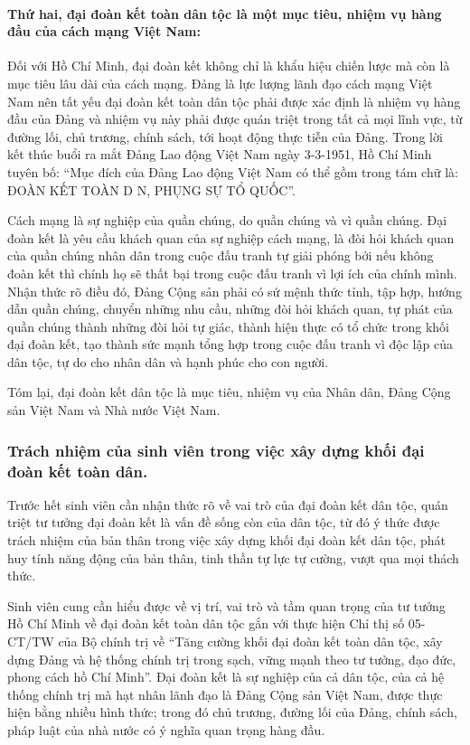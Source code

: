 \paragraph{Thứ hai, đại đoàn kết toàn dân tộc là một mục tiêu, nhiệm vụ hàng đầu của cách mạng Việt Nam:}
Đối với Hồ Chí Minh, đại đoàn kết không chỉ là khẩu hiệu chiến lược mà còn là mục tiêu lâu dài của cách mạng. Đảng là lực lượng lãnh đạo cách mạng Việt Nam nên tất yếu đại đoàn kết toàn dân tộc phải được xác định là nhiệm vụ hàng đầu của Đảng và nhiệm vụ này phải được quán triệt trong tất cả mọi lĩnh vực, từ đường lối, chủ trương, chính sách, tới hoạt động thực tiễn của Đảng. Trong lời kết thúc buổi ra mắt Đảng Lao động Việt Nam ngày 3-3-1951, Hồ Chí Minh tuyên bố: “Mục đích của Đảng Lao động Việt Nam có thể gồm trong tám chữ là: ĐOÀN KẾT TOÀN D N, PHỤNG SỰ TỔ QUỐC”.

Cách mạng là sự nghiệp của quần chúng, do quần chúng và vì quần chúng. Đại đoàn kết là yêu cầu khách quan của sự nghiệp cách mạng, là đòi hỏi khách quan của quần chúng nhân dân trong cuộc đấu tranh tự giải phóng bởi nếu không đoàn kết thì chính họ sẽ thất bại trong cuộc đấu tranh vì lợi ích của chính mình. Nhận thức rõ điều đó, Đảng Cộng sản phải có sứ mệnh thức tỉnh, tập hợp, hướng dẫn quần chúng, chuyển những nhu cầu, những đòi hỏi khách quan, tự phát của quần chúng thành những đòi hỏi tự giác, thành hiện thực có tổ chức trong khối đại đoàn kết, tạo thành sức mạnh tổng hợp trong cuộc đấu tranh vì độc lập của dân tộc, tự do cho nhân dân và hạnh phúc cho con người.

Tóm lại, đại đoàn kết dân tộc là mục tiêu, nhiệm vụ của Nhân dân, Đảng Cộng sản Việt Nam và Nhà nước Việt Nam.

\subsubsection{Trách nhiệm của sinh viên trong việc xây dựng khối đại đoàn kết toàn dân.}

Trước hết sinh viên cần nhận thức rõ về vai trò của đại đoàn kết dân tộc, quán triệt tư tưởng đại đoàn kết là vấn đề sống còn của dân tộc, từ đó ý thức được trách nhiệm của bản thân trong việc xây dựng khối đại đoàn kết dân tộc, phát huy tính năng động của bản thân, tinh thần tự lực tự cường, vượt qua mọi thách thức.

Sinh viên cung cần hiểu được về vị trí, vai trò và tầm quan trọng của tư tưởng Hồ Chí Minh về đại đoàn kết toàn dân tộc gắn với thực hiện Chỉ thị số 05- CT/TW của Bộ chính trị về “Tăng cường khối đại đoàn kết toàn dân tộc, xây dựng Đảng và hệ thống chính trị trong sạch, vững mạnh theo tư tưởng, đạo đức, phong cách hồ Chí Minh”. Đại đoàn kết là sự nghiệp của cả dân tộc, của cả hệ thống chính trị mà hạt nhân lãnh đạo là Đảng Cộng sản Việt Nam, được thực hiện bằng nhiều hình thức; trong đó chủ trương, đường lối của Đảng, chính sách, pháp luật của nhà nước có ý nghĩa quan trọng hàng đầu.

